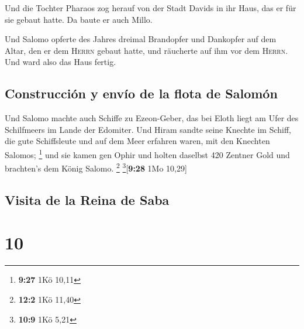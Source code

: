  Und die Tochter Pharaos zog herauf von der Stadt Davids
in ihr Haus, das er für sie gebaut hatte. Da baute er auch Millo.

 Und Salomo opferte des Jahres dreimal Brandopfer und
Dankopfer auf dem Altar, den er dem \textsc{Herrn} gebaut hatte, und
räucherte auf ihm vor dem \textsc{Herrn}. Und ward also das Haus fertig.

\hypertarget{construcciuxf3n-y-envuxedo-de-la-flota-de-salomuxf3n}{%
\subsection{Construcción y envío de la flota de
Salomón}\label{construcciuxf3n-y-envuxedo-de-la-flota-de-salomuxf3n}}

 Und Salomo machte auch Schiffe zu Ezeon-Geber, das bei
Eloth liegt am Ufer des Schilfmeers im Lande der Edomiter.
 Und Hiram sandte seine Knechte im Schiff, die gute
Schiffsleute und auf dem Meer erfahren waren, mit den Knechten Salomos;
\footnote{\textbf{9:27} 1Kö 10,11}  und sie kamen gen
Ophir und holten daselbst 420 Zentner Gold und brachten's dem König
Salomo. \footnote{\textbf{12:2} 1Kö 11,40} \footnote{\textbf{10:9} 1Kö
  5,21}{[}\textbf{9:28} 1Mo 10,29{]}

\hypertarget{visita-de-la-reina-de-saba}{%
\subsection{Visita de la Reina de
Saba}\label{visita-de-la-reina-de-saba}}

\hypertarget{section-9}{%
\section{10}\label{section-9}}

